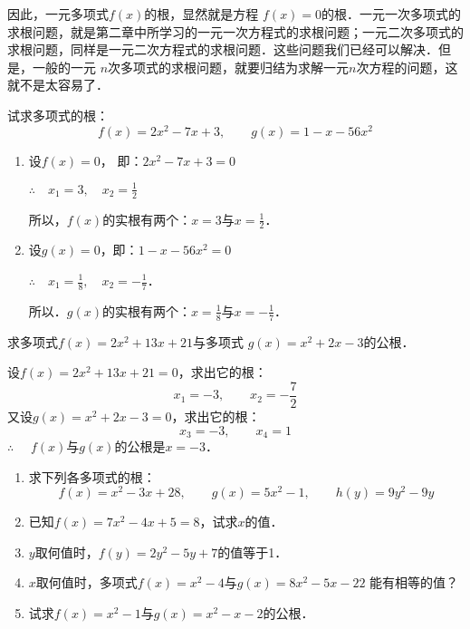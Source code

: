 因此，一元多项式$f(x)$的根，显然就是方程
$f(x)=0$的根．一元一次多项式的求根问题，就是第二章中所学习的一元一次方程式的求根问题；一元二次多项式的求根问题，同样是一元二次方程式的求根问题．这些问题我们已经可以解决．但是，一般的一元
$n$次多项式的求根问题，就要归结为求解一元$n$次方程的问题，这就不是太容易了．

\begin{example}
    试求多项式的根：
\[f (x) =2x^2-7x+3,\qquad g (x) =1-x-56x^2\]
\end{example}

\begin{solution}
  \begin{enumerate}
      \item 设$f(x)=0$，
      即：$2x^2-7x+3=0$

      $\therefore\quad x_1=3,\quad x_2=\frac{1}{2}$

      所以，$f(x)$的实根有两个：$x=3$与$x=\frac{1}{2}$．
      \item 设$g(x)=0$，即：$1-x-56x^2=0$
      
$\therefore\quad x_1=\frac{1}{8},\quad x_2=-\frac{1}{7}$．

所以．$g(x)$的实根有两个：$x=\frac{1}{8}$与$x=-\frac{1}{7}$．
  \end{enumerate}  
\end{solution}

\begin{example}
    求多项式$f(x)=2x^2+13x+21$与多项式
$g(x)=x^2+2x-3$的公根．
\end{example}

\begin{solution}
    设$f(x)=2x^2+13x+21=0$，求出它的根：
\[x_1=-3,\qquad x_2=-\frac{7}{2}\]
又设$g(x)=x^2+2x-3=0$，求出它的根：
\[x_3=-3,\qquad x_4=1\]
$\therefore\quad $ $f(x)$与$g(x)$的公根是$x=-3$．
\end{solution}

\begin{ex}
    \begin{enumerate}
        \item 求下列各多项式的根：
        \[f (x) =x^2-3x+28,\qquad g (x) =5x^2-1,\qquad h (y) =9y^2-9y\]
        \item 已知$f(x)=7x^2-4x+5=8$，试求$x$的值．
        \item $y$取何值时，$f(y)=2y^2-5y+7$的值等于1．
        \item $x$取何值时，多项式$f(x)=x^2-4$与$g(x)=8x^2-5x-22$
能有相等的值？
\item 试求$f(x)=x^2-1$与$g(x)=x^2-x-2$的公根．
    \end{enumerate}
\end{ex}


